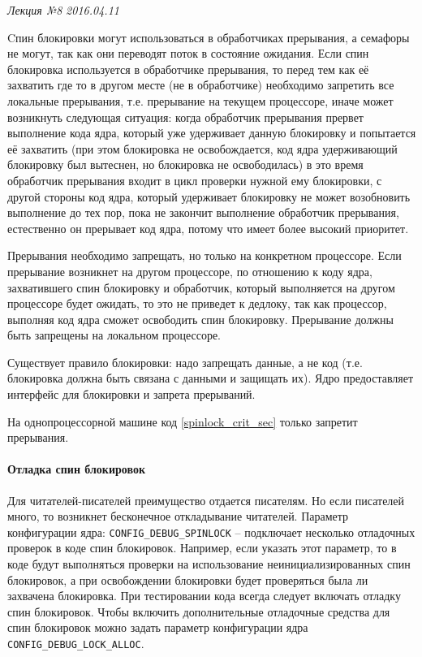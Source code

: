 \clearpage
\begin{flushright}
	\textit{Лекция №8}
	\textit{2016.04.11}
\end{flushright}

Cпин блокировки могут использоваться в обработчиках прерывания, а семафоры не могут, так как они переводят поток в состояние ожидания.
Если спин блокировка используется в обработчике прерывания, то перед тем как её захватить где то в другом месте (не в обработчике) необходимо запретить все локальные прерывания, т.е. прерывание на текущем процессоре, иначе может возникнуть следующая ситуация: когда обработчик прерывания прервет выполнение кода ядра, который уже удерживает данную блокировку  и попытается её захватить (при этом блокировка не освобождается, код ядра удерживающий блокировку был вытеснен, но блокировка не освободилась) в это время обработчик прерывания входит в цикл проверки нужной ему блокировки, с другой стороны код ядра, который удерживает блокировку не может возобновить выполнение до тех пор, пока не закончит выполнение обработчик прерывания, естественно он прерывает код ядра, потому что имеет более высокий приоритет. 

Прерывания необходимо запрещать, но только на конкретном процессоре. Если прерывание возникнет на другом процессоре, по отношению к коду ядра, захватившего спин блокировку и обработчик, который выполняется на другом процессоре будет ожидать, то это не приведет к дедлоку, так как процессор, выполняя код ядра сможет освободить спин блокировку. Прерывание должны быть запрещены на локальном процессоре. 

Существует правило блокировки: надо запрещать данные, а не код (т.е. блокировка должна быть связана с данными и защищать их). Ядро предоставляет интерфейс для блокировки и запрета прерываний.

 

На однопроцессорной машине код \ref{spinlock_crit_sec} только запретит прерывания.

\paragraph{Отладка спин блокировок}

Для читателей-писателей преимущество отдается писателям. Но если писателей много, то возникнет бесконечное откладывание читателей.
Параметр конфигурации ядра: \verb|CONFIG_DEBUG_SPINLOCK| – подключает несколько отладочных проверок в коде спин блокировок. Например, если указать этот параметр, то в коде будут выполняться проверки на использование неинициализированных спин блокировок, а при освобождении блокировки будет проверяться была ли захвачена блокировка. При тестировании кода всегда следует включать отладку спин блокировок. Чтобы включить дополнительные отладочные средства для спин блокировок можно задать параметр конфигурации ядра \verb|CONFIG_DEBUG_LOCK_ALLOC|.

